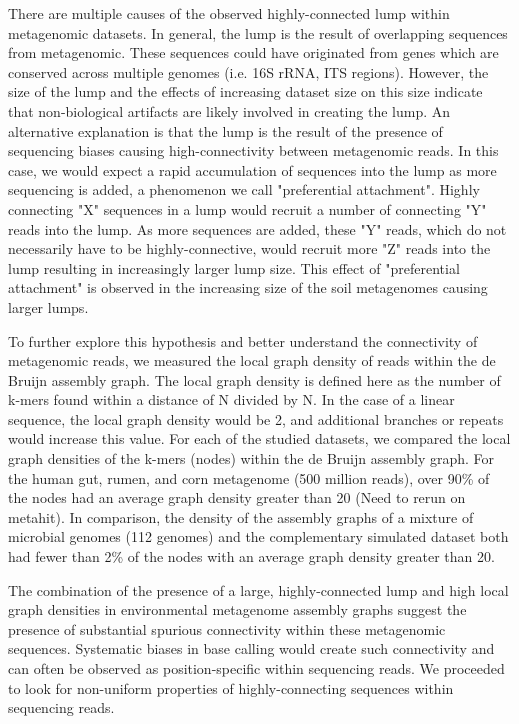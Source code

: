 \documentclass[11pt]{article} %
\begin{document}
There are multiple causes of the observed highly-connected lump within metagenomic datasets.  In general, the lump is the result of overlapping sequences from metagenomic.  These sequences could have originated from genes which are conserved across multiple genomes (i.e. 16S rRNA, ITS regions).  However, the size of the lump and the effects of increasing dataset size on this size indicate that non-biological artifacts are likely involved in creating the lump.  An alternative explanation is that the lump is the result of the presence of sequencing biases causing high-connectivity between metagenomic reads.  In this case, we would expect a rapid accumulation of sequences into the lump as more sequencing is added, a phenomenon we call "preferential attachment".   Highly connecting "X" sequences in a lump would recruit a number of connecting "Y" reads into the lump.  As more sequences are added, these "Y" reads, which do not necessarily have to be highly-connective, would recruit more "Z" reads into the lump resulting in increasingly larger lump size.  This effect of "preferential attachment" is observed in the increasing size of the soil metagenomes causing larger lumps. 

To further explore this hypothesis and better understand the connectivity of metagenomic reads, we measured the local graph density of reads within the de Bruijn assembly graph. The local graph density is defined here as the number of k-mers found within a distance of N divided by N.  In the case of a linear sequence, the local graph density would be 2, and additional branches or repeats would increase this value. For each of the studied datasets, we compared the local graph densities of the k-mers (nodes) within the de Bruijn assembly graph.  For the human gut, rumen, and corn metagenome (500 million reads), over 90\% of the nodes had an average graph density greater than 20 (Need to rerun on metahit).  In comparison, the density of the assembly graphs of a mixture of microbial genomes (112 genomes) and the complementary simulated dataset both had fewer than 2\% of the nodes with an average graph density greater than 20.  

The combination of the presence of a large, highly-connected lump and high local graph densities in environmental metagenome assembly graphs suggest the presence of substantial spurious connectivity within these metagenomic sequences.  Systematic biases in base calling would create such connectivity and can often be observed as position-specific within sequencing reads.  We proceeded to look for non-uniform properties of highly-connecting sequences within sequencing reads.
\end{document}
